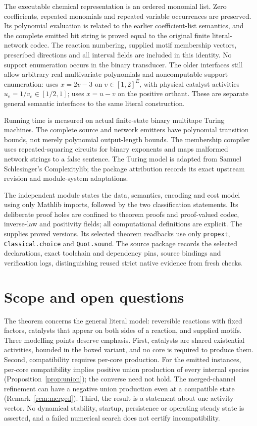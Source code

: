 \documentclass[11pt,a4paper]{article}
\theoremstyle{plain}
\theoremstyle{definition}
\theoremstyle{remark}
\begin{document}
The executable chemical representation is an ordered monomial list. Zero coefficients, repeated monomials and repeated variable occurrences are preserved. Its polynomial evaluation is related to the earlier coefficient-list semantics, and the complete emitted bit string is proved equal to the original finite literal-network codec. The reaction numbering, supplied motif membership vectors, prescribed directions and all interval fields are included in this identity. No support enumeration occurs in the binary transducer. The older  interfaces still allow arbitrary real multivariate polynomials and noncomputable support enumeration:  uses $x=2v-3$ on $v\in[1,2]^E$, with physical catalyst activities $u_e=1/v_e\in[1/2,1]$;  uses $x=u-v$ on the positive orthant. These are separate general semantic interfaces to the same literal construction.

Running time is measured on actual finite-state binary multitape Turing machines. The complete source and network emitters have polynomial transition bounds, not merely polynomial output-length bounds. The membership compiler uses repeated-squaring circuits for binary exponents and maps malformed network strings to a false sentence. The Turing model is adapted from Samuel Schlesinger's Complexitylib; the package attribution records its exact upstream revision and module-system adaptations.

The independent  module states the data, semantics, encoding and cost model using only Mathlib imports, followed by the two classification statements. Its deliberate proof holes are confined to theorem proofs and proof-valued codec, inverse-law and positivity fields; all computational definitions are explicit. The  supplies proved versions. Its selected theorem readbacks use only \texttt{propext}, \texttt{Classical.choice} and \texttt{Quot.sound}. The source package records the selected declarations, exact toolchain and dependency pins, source bindings and verification logs, distinguishing reused strict native evidence from fresh checks.

\section{Scope and open questions}\label{sec:discussion}

The theorem concerns the general literal model: reversible reactions with fixed factors, catalysts that appear on both sides of a reaction, and supplied motifs. Three modelling points deserve emphasis. First, catalysts are shared existential activities, bounded in the boxed variant, and no core is required to produce them. Second, compatibility requires per-core production. For the emitted instances, per-core compatibility implies positive union production of every internal species (Proposition~\ref{prop:union}); the converse need not hold. The merged-channel refinement can have a negative union production even at a compatible state (Remark~\ref{rem:merged}). Third, the result is a statement about one activity vector. No dynamical stability, startup, persistence or operating steady state is asserted, and a failed numerical search does not certify incompatibility.
\end{document}
